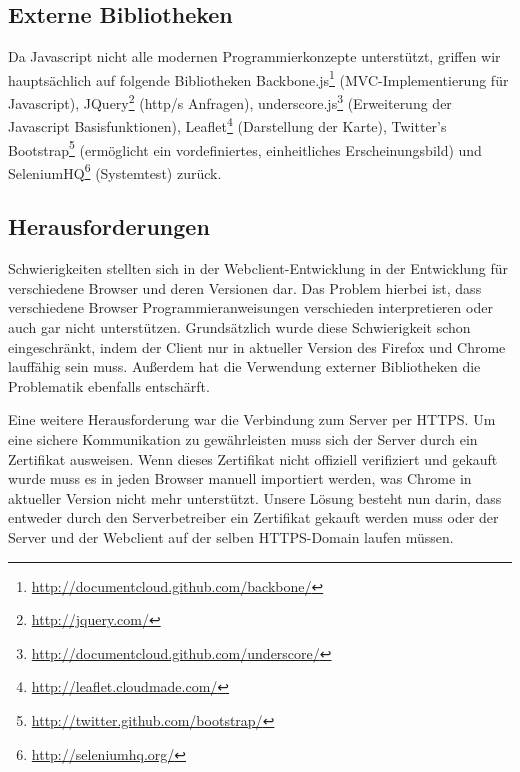 \subsection*{Externe Bibliotheken}

Da Javascript nicht alle modernen Programmierkonzepte unterstützt, griffen wir hauptsächlich auf folgende Bibliotheken 
Backbone.js\footnote{\url{http://documentcloud.github.com/backbone/}} (MVC-Implementierung für Javascript), 
JQuery\footnote{\url{http://jquery.com/}} (http/s Anfragen), 
underscore.js\footnote{\url{http://documentcloud.github.com/underscore/}} (Erweiterung der Javascript Basisfunktionen),
Leaflet\footnote{\url{http://leaflet.cloudmade.com/}} (Darstellung der Karte),  
Twitter's Bootstrap\footnote{\url{http://twitter.github.com/bootstrap/}} (ermöglicht ein vordefiniertes, einheitliches Erscheinungsbild) und
SeleniumHQ\footnote{\url{http://seleniumhq.org/}} (Systemtest) zurück.

\subsection*{Herausforderungen}

Schwierigkeiten stellten sich in der Webclient-Entwicklung in der Entwicklung für verschiedene Browser und deren Versionen dar.
Das Problem hierbei ist, dass verschiedene Browser Programmieranweisungen verschieden interpretieren oder auch gar nicht unterstützen. 
Grundsätzlich wurde diese Schwierigkeit schon eingeschränkt, indem der Client nur in aktueller Version des Firefox und Chrome lauffähig sein muss. Außerdem hat die Verwendung externer Bibliotheken die Problematik ebenfalls entschärft.

Eine weitere Herausforderung war die Verbindung zum Server per HTTPS.
Um eine sichere Kommunikation zu gewährleisten muss sich der Server durch ein Zertifikat ausweisen.
Wenn dieses Zertifikat nicht offiziell verifiziert und gekauft wurde muss es in jeden Browser manuell importiert werden, was Chrome in aktueller Version nicht mehr unterstützt.
Unsere Lösung besteht nun darin, dass entweder durch den Serverbetreiber ein Zertifikat gekauft werden muss oder der Server und der Webclient auf der selben HTTPS-Domain laufen müssen.
